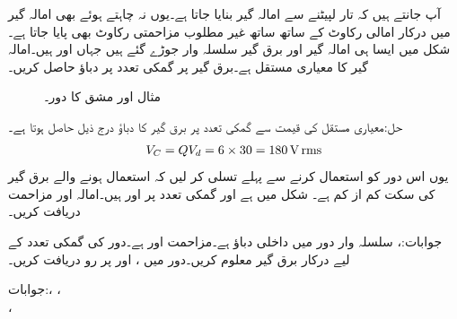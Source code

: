 آپ جانتے ہیں کہ تار لپیٹنے سے امالہ گیر بنایا جاتا ہے۔یوں نہ چاہتے ہوئے بھی امالہ گیر میں درکار امالی رکاوٹ کے ساتھ ساتھ غیر مطلوب مزاحمتی رکاوٹ بھی پایا جاتا ہے۔شکل  میں ایسا ہی امالہ گیر اور برق گیر سلسلہ وار جوڑے گئے ہیں جہاں  اور  ہیں۔امالہ گیر کا معیاری مستقل  ہے۔برق گیر پر گمکی تعدد پر دباؤ حاصل کریں۔
\begin{figure}
\centering
{}
\caption{مثال  اور مشق  کا دور۔}
\label{شکل_تعددی_امالہ_معیاری_مستقل}
\end{figure}

حل:معیاری مستقل کی قیمت سے گمکی تعدد پر برق گیر کا دباؤ درج ذیل حاصل ہوتا ہے۔
\begin{align*}
V_C=Q V_d=6\times 30=\SI{180}{\volt}\,{\textup{rms}}
\end{align*}
یوں اس دور کو استعمال کرنے سے پہلے تسلی کر لیں کہ استعمال ہونے والے برق گیر کی سکت کم از کم  ہے۔
شکل  میں  ہے اور گمکی تعدد پر  اور  ہیں۔امالہ اور مزاحمت دریافت کریں۔

جوابات:، 
سلسلہ وار  دور میں داخلی دباؤ  ہے۔مزاحمت  اور  ہے۔دور کی گمکی تعدد  کے لیے درکار برق گیر معلوم کریں۔دور میں ،  اور  پر رو دریافت کریں۔

جوابات:، ، \\
، 

